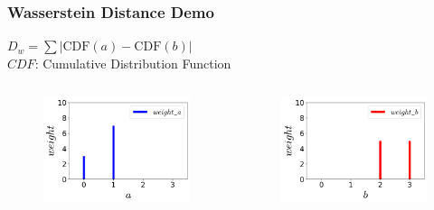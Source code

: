 \documentclass{beamer}
\begin{document}


\begin{frame}
\frametitle{Wasserstein Distance Demo}
\setlength{\abovecaptionskip}{-2mm}
\setlength{\belowcaptionskip}{0mm}
$D_{w}=\sum|\mathrm{CDF}(a) - \mathrm{CDF}(b)|$ \\
$CDF$: Cumulative Distribution Function
\begin{columns}
\begin{figure}
    \centering
    \includegraphics[width=1.0\linewidth]{img/a.png}
\end{figure}
\vspace{-7mm}
\begin{figure}
    \centering
    \includegraphics[width=1.0\linewidth]{img/b.png}
\end{figure}

\end{columns}
\end{frame}
\end{document}
